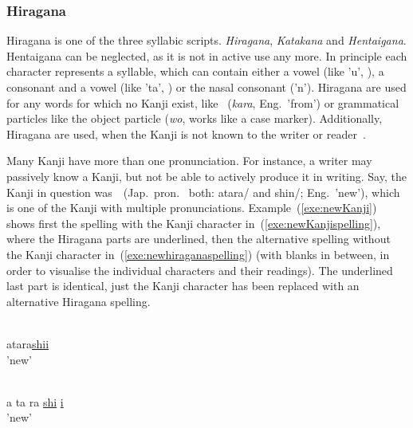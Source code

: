 \subsubsection{Hiragana }
\label{sec:hiragana}

Hiragana is one of the three syllabic scripts. \emph{Hiragana}, \emph{Katakana} 
and \emph{Hentaigana}. Hentaigana can be neglected, as it is not in active use 
any more. %
In principle each character represents a syllable, which can contain either a 
vowel (like 'u', ), a consonant and a vowel (like 'ta', ) or the 
nasal consonant  ('n').
Hiragana are used for any words for which no Kanji exist, like 
~(\emph{kara}, Eng.~'from') or grammatical particles like the object 
particle  (\emph{wo}, works like a case marker).
Additionally, Hiragana are used, when the Kanji is not known to the writer or 
reader~. 

Many Kanji have more than one pronunciation.
For instance, a writer may passively know a Kanji, but not be able to actively 
produce it in writing. Say, the Kanji in question was~~(Jap.~pron.~
both: atara/ and shin/; Eng.~'new'), which is one of the 
Kanji with multiple pronunciations.
Example~(\ref{exe:newKanji})
shows first the spelling with the Kanji character 
in~(\ref{exe:newKanjispelling}), where the Hiragana parts are underlined,
then the alternative spelling without the Kanji character 
in~(\ref{exe:newhiraganaspelling}) (with blanks in between, in order to visualise
the individual characters and their readings). The underlined last part is 
identical, just the Kanji character has been replaced with an alternative 
Hiragana spelling.
\begin{exe}
\ex \label{exe:newKanji}
\begin{xlist}
\ex \label{exe:newKanjispelling}
\gll {}\underline{} \\
atara\underline{shii} \\
\trans 'new'

\ex \label{exe:newhiraganaspelling}
\gll {}   \underline{} \underline{} \\
a ta ra \underline{shi} \underline{i} \\
\trans 'new'
\end{xlist}
\end{exe}

